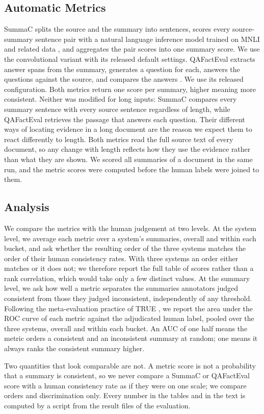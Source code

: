 \subsection{Automatic Metrics}
SummaC splits the source and the summary into sentences, scores every source-summary sentence pair with a natural language inference model trained on MNLI and related data \citep{laban2022summac,williams2018mnli}, and aggregates the pair scores into one summary score. We use the convolutional variant with its released default settings. QAFactEval extracts answer spans from the summary, generates a question for each, answers the questions against the source, and compares the answers \citep{fabbri2022qafacteval}. We use its released configuration. Both metrics return one score per summary, higher meaning more consistent. Neither was modified for long inputs: SummaC compares every summary sentence with every source sentence regardless of length, while QAFactEval retrieves the passage that answers each question. Their different ways of locating evidence in a long document are the reason we expect them to react differently to length. Both metrics read the full source text of every document, so any change with length reflects how they use the evidence rather than what they are shown. We scored all summaries of a document in the same run, and the metric scores were computed before the human labels were joined to them.

\subsection{Analysis}
We compare the metrics with the human judgement at two levels. At the system level, we average each metric over a system's summaries, overall and within each bucket, and ask whether the resulting order of the three systems matches the order of their human consistency rates. With three systems an order either matches or it does not; we therefore report the full table of scores rather than a rank correlation, which would take only a few distinct values. At the summary level, we ask how well a metric separates the summaries annotators judged consistent from those they judged inconsistent, independently of any threshold. Following the meta-evaluation practice of TRUE \citep{honovich2022true}, we report the area under the ROC curve of each metric against the adjudicated human label, pooled over the three systems, overall and within each bucket. An AUC of one half means the metric orders a consistent and an inconsistent summary at random; one means it always ranks the consistent summary higher.

Two quantities that look comparable are not. A metric score is not a probability that a summary is consistent, so we never compare a SummaC or QAFactEval score with a human consistency rate as if they were on one scale; we compare orders and discrimination only. Every number in the tables and in the text is computed by a script from the result files of the evaluation.
